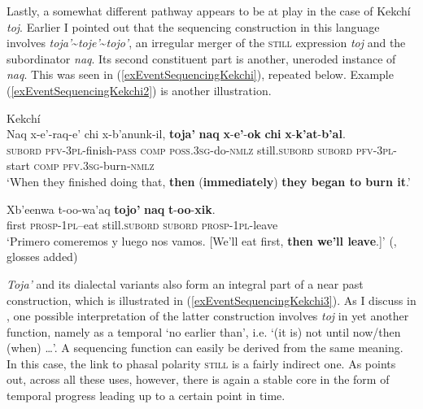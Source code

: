Lastly, a somewhat different pathway appears to be at play in the case of Kekchí \textit{toj}. Earlier I pointed out that the sequencing construction in this language involves \textit{toja’}\sim\textit{toje’}\sim\textit{tojo’}, an irregular merger of the \textsc{still} expression \textit{toj} and the subordinator \textit{naq}. Its second constituent part is another, uneroded instance of \textit{naq}. This was seen in (\ref{exEventSequencingKekchi}), repeated below. Example (\ref{exEventSequencingKekchi2}) is another illustration.

\begin{exe}
	Kekchí\\
	\gll Naq x-e'-raq-e' chi x-b'anunk-il, \textbf{toja'} \textbf{naq} \textbf{x}-\textbf{e'}-\textbf{ok} \textbf{chi} \textbf{x}-\textbf{k'at}-\textbf{b'al}.\\
	\textsc{subord} \textsc{pfv}-3\textsc{pl}-finish-\textsc{pass} \textsc{comp} \textsc{poss}.3\textsc{sg}-do-\textsc{nmlz} still.\textsc{subord} \textsc{subord} \textsc{pfv}-3\textsc{pl}-start \textsc{comp} \textsc{pfv}.3\textsc{sg}-burn-\textsc{nmlz}\\
	\glt \lq When they finished doing that, \textbf{then} (\textbf{immediately}) \textbf{they began to burn it}.' \parencite[468]{Kockelman2020}

	\ex\label{exEventSequencingKekchi2}
	\gll Xb’eenwa t-oo-wa’aq \textbf{tojo’} \textbf{naq} \textbf{t}-\textbf{oo}-\textbf{xik}.\\
	first  \textsc{prosp}-1\textsc{pl}--eat still.\textsc{subord} \textsc{subord} \textsc{prosp}-1\textsc{pl}-leave\\
	\glt \lq Primero comeremos y luego nos vamos. [We'll eat first, \textbf{then we'll leave}.]\rq{ }(\cite[193]{VocabularioKechi2004}, glosses added)
\end{exe}

\textit{Toja’} and its dialectal variants also form an integral part of a near past construction, which is illustrated in (\ref{exEventSequencingKekchi3}). As I discuss in , one possible interpretation of the latter construction involves \textit{toj} in yet another function, namely as a temporal  \lq no earlier than\rq{}, i.e. \lq (it is) not until now/then (when) …\rq{}. A sequencing function can easily be derived from the same meaning. In this case, the link to phasal polarity \textsc{still} is a fairly indirect one. As \textcite{Kockelman2020} points out, across all these uses, however, there is again a stable core in the form of temporal progress leading up to a certain point in time.\pagebreak

